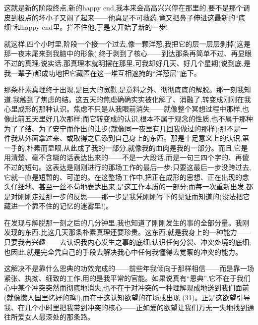 这就是新的阶段终点,新的happy end,我本来会高高兴兴停在那里的,要不是那个调皮到极点的坏小子又闹了起来——他真是不可救药,竟又把鼻子伸进这最新的“底细”和happy end里。拦不住他,于是又开始了新的一步!

就这样,四个小时里,阶段一个接一个过去,像一颗洋葱,我把它的层一层层剥掉(这是那一夜末尾来到我脑中的形象),终于剥到了核心——到达那条再简单不过、再显眼不过的真理;说实话,那真理本就明摆在那里,可我却好几天、好几个星期(说到底,是我一辈子)都成功地把它藏匿在这一堆互相遮掩的“洋葱层”底下。

那条朴素真理终于出现,是巨大的宽慰,是意料之外、彻彻底底的解脱。那一刻我知道,我触到了焦虑的结。这五天的焦虑确确实实被化解了、消融了,转变成刚刚在我心里成形的那种认识。焦虑不只是从我眼前消失——就像整个冥想过程中那样,也像此前五天里好几次那样;而它转变成的认识,根本不属于观念的性质,也不属于那种为了了结、为了安宁而作出的让步(就像同一夜里有几回我做过的那样);那不是一件我从外面拿过来、或取得之后添到自己身上的东西。那是十足意义上的认识,第一手的,朴素而显眼,从此成了我的一部分,就像我的血肉是我的一部分。而且,它是用清楚、毫不含糊的话表达出来的——不是一大段话,而是一句三四个字的、再傻不过的短句。这表达是刚刚进行的那场工作的最后一步;只要这最后一步没跨过去,它就一直是短暂的、可逆的。在这整场工作中,把正在成形的思想、正在出现的念头仔细地、甚至一丝不苟地表达出来,是这工作本质的一部分;而每一次重新出发,都是对刚刚走过那一步的反思——那一步是我凭刚刚写下的见证而知道的(没法把它藏进一个靠不住的记忆的迷雾里!)。

在发现与解脱那一刻之后的几分钟里,我也知道了刚刚发生的事的全部分量。我刚发现的东西,比这几天那条朴素真理还要珍贵。这东西,就是我身上的一种能力——只要我有兴趣——去认识我内心发生之事的底细,认识任何分裂、冲突处境的底细;也因此,就是完全凭自己的手段去解决我心中任何我懂得去觉察的冲突的能力。

这解决不是靠什么恩典的功效完成的——前些年我倾向于那样相信——而是靠一场紧张、执拗、细致的工作,用的是我平常的官能。如果说真有“恩典”,它不在于我们心中某个冲突突然而彻底地消失,也不在于对冲突的一种理解现成地送到我们面前(就像懒人国里烤好的鸡!),而在于这认知欲望的在场或出现 (31)。正是这欲望引导我、在几个小时里把我带到冲突的核心——正如爱的欲望让我们万无一失地找到通往所爱女人最深处的那条路。

